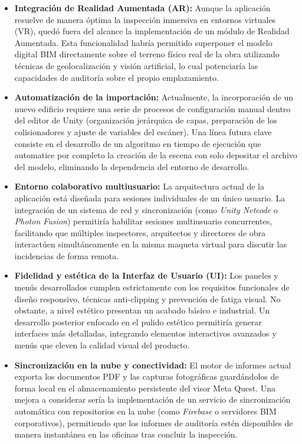 \begin{itemize}
    \item \textbf{Integración de Realidad Aumentada (AR):} Aunque la aplicación resuelve de manera óptima la inspección inmersiva en entornos virtuales (VR), quedó fuera del alcance la implementación de un módulo de Realidad Aumentada. Esta funcionalidad habría permitido superponer el modelo digital BIM directamente sobre el terreno físico real de la obra utilizando técnicas de geolocalización y visión artificial, lo cual potenciaría las capacidades de auditoría sobre el propio emplazamiento.
    \item \textbf{Automatización de la importación:} Actualmente, la incorporación de un nuevo edificio requiere una serie de procesos de configuración manual dentro del editor de Unity (organización jerárquica de capas, preparación de los colisionadores y ajuste de variables del escáner). Una línea futura clave consiste en el desarrollo de un algoritmo en tiempo de ejecución que automatice por completo la creación de la escena con solo depositar el archivo del modelo, eliminando la dependencia del entorno de desarrollo.
    \item \textbf{Entorno colaborativo multiusuario:} La arquitectura actual de la aplicación está diseñada para sesiones individuales de un único usuario. La integración de un sistema de red y sincronización (como \textit{Unity Netcode} o \textit{Photon Fusion}) permitiría habilitar sesiones multiusuario concurrentes, facilitando que múltiples inspectores, arquitectos y directores de obra interactúen simultáneamente en la misma maqueta virtual para discutir las incidencias de forma remota.
    \item \textbf{Fidelidad y estética de la Interfaz de Usuario (UI):} Los paneles y menús desarrollados cumplen estrictamente con los requisitos funcionales de diseño responsivo, técnicas anti-clipping y prevención de fatiga visual. No obstante, a nivel estético presentan un acabado básico e industrial. Un desarrollo posterior enfocado en el pulido estético permitiría generar interfaces más detalladas, integrando elementos interactivos avanzados y menús que eleven la calidad visual del producto.
    \item \textbf{Sincronización en la nube y conectividad:} El motor de informes actual exporta los documentos PDF y las capturas fotográficas guardándolos de forma local en el almacenamiento persistente del visor Meta Quest. Una mejora a considerar sería la implementación de un servicio de sincronización automática con repositorios en la nube (como \textit{Firebase} o servidores BIM corporativos), permitiendo que los informes de auditoría estén disponibles de manera instantánea en las oficinas tras concluir la inspección.

\end{itemize}
